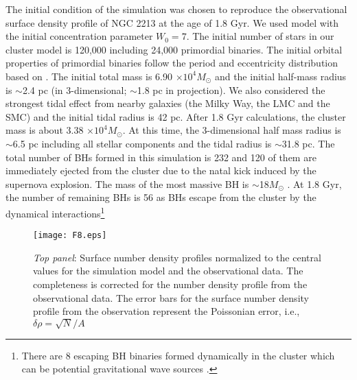 \documentclass[useAMS,usenatbib,twocolumn]{mnras}
\begin{document}
The initial condition of the simulation was chosen to reproduce the observational surface density profile of NGC 2213 at the age of 1.8 Gyr. We used \citet{1966AJ.....71...64K} model with the initial concentration parameter $W_0 = 7$.
The initial number of stars in our cluster model is 120,000 including 24,000 primordial binaries. The initial orbital properties of primordial binaries follow the period and eccentricity distribution based on \citet{1995MNRAS.277.1507K}. The initial total mass is 6.90 $\times10^{4} M_{\odot}$ and the initial half-mass radius is $\sim$2.4 pc (in 3-dimensional; $\sim$1.8 pc in projection). We also considered the strongest tidal effect from nearby galaxies (the Milky Way, the LMC and the SMC) and the initial tidal radius is 42 pc. After 1.8 Gyr calculations, the cluster mass is about 3.38 $\times10^{4} M_{\odot}$. At this time, the 3-dimensional half mass radius is $\sim$6.5 pc including all stellar components and the tidal radius is $\sim$31.8 pc. The total number of BHs formed in this simulation is 232 and 120 of them are immediately ejected from the cluster due to the natal kick induced by the supernova explosion. The mass of the most massive BH is $\sim$18$M_{\odot}$ \citep[see e.g.,][for more details; note that the mass distribution and the retention fraction of BHs are sensitive to the metallicity]{2016MNRAS.463.2109R}.  At 1.8 Gyr, the number of remaining BHs is 56 as BHs escape from the cluster by the dynamical interactions\footnote{There are 8 escaping BH binaries formed dynamically in the cluster which can be potential gravitational wave sources \citep[see e.g.,][]{2017MNRAS.467..524B,2018MNRAS.473..909B}.}

\begin{figure}
  \centering
  \texttt{[image: F8.eps]}
  \caption{{\it Top panel}: Surface number density profiles normalized to the central values for the simulation model and the observational data. The completeness is corrected for the number density profile from the observational data. The error bars for the surface number density profile from the observation represent the Poissonian error, i.e., $\delta{\rho}=\sqrt{N}/A$}\label{F8}
\end{figure}
\end{document}
